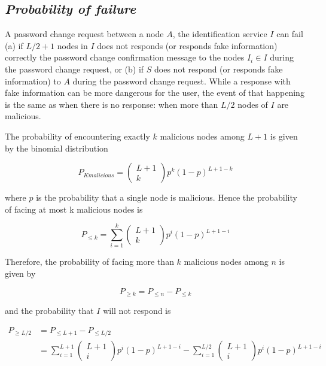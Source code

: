   \subsection{\textit{Probability of failure}}
    A password change request between a node $A$, the identification service
$I$ can fail (a) if $L/2 + 1$ nodes in $I$ does not responds (or responds fake
information) correctly the password change confirmation message to the nodes 
$I_i \in I$ during the password change request, or (b) if $S$ does not respond (or responds fake information) to $A$
during the password change request. While a response with fake information can be more dangerous for the
user, the event of that happening is the same as when there is no response:
when more than $L/2$ nodes of $I$ are malicious.

The probability of encountering exactly $k$ malicious nodes among $L +1$ is given by the binomial
distribution

    \begin{equation}
      P_{K malicious} = \begin{pmatrix} L+1 \\ k\end{pmatrix} p^k (1-p)^{L+1-k}
    \end{equation}

    where $p$ is the probability that a single node is malicious. Hence the
probability of facing at most k malicious nodes is 

    \begin{equation}
      P_{\leq k} = \sum_{i=1}^{k} \begin{pmatrix} L+1 \\ k\end{pmatrix} p^i (1-p)^{L+1-i}
    \end{equation}

    Therefore, the probability of facing more than $k$ malicious nodes among
$n$ is given by

    \begin{equation}
      P_{\ge k} = P_{\leq n} - P_{\leq k}
    \end{equation}

    and the probability that $I$ will not respond is

    \begin{align}
      P_{\ge L/2} &= P_{\leq L+1} - P_{\leq L/2} \\
      &= \sum_{i=1}^{L+1} \begin{pmatrix} L+1 \\ i\end{pmatrix} p^i (1-p)^{L+1-i}
      - \sum_{i=1}^{L/2} \begin{pmatrix} L+1 \\ i\end{pmatrix} p^i (1-p)^{L+1-i}
    \end{align}

